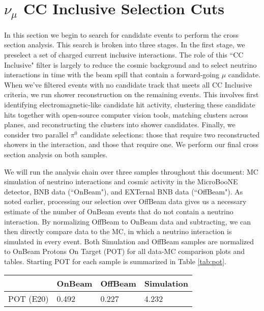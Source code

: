 \clearpage
\section{ $\nu_{\mu}$ CC Inclusive Selection Cuts }


\par In this section we begin to search for candidate events to perform the cross section analysis. This search is broken into three stages.  In the first stage, we preselect a set of charged current inclusive interactions. The role of this ``CC Inclusive" filter is largely to reduce the cosmic background and to select neutrino interactions in time with the beam spill that contain a forward-going $\mu$ candidate.  When we've filtered events with no candidate track that meets all CC Inclusive criteria, we run shower reconstruction on the remaining events.  This involves first identifying electromagnetic-like candidate hit activity, clustering these candidate hits together with open-source computer vision tools, matching clusters across planes, and reconstructing the clusters into shower candidates.  Finally, we consider two parallel $\pi^0$ candidate selections: those that require two reconstructed showers in the interaction, and those that require one.  We perform our final cross section analysis on both samples.
\par We will run the analysis chain over three samples throughout this document: MC simulation of neutrino interactions and cosmic activity in the MicroBooNE detector, BNB data (``OnBeam"), and EXTernal BNB data (``OffBeam").  As noted earlier, processing our selection over OffBeam data gives us a necessary estimate of the number of OnBeam events that do not contain a neutrino interaction.  By normalizing OffBeam to OnBeam data and subtracting, we can then directly compare data to the MC, in which a neutrino interaction is simulated in every event.  Both Simulation and OffBeam samples are normalized to OnBeam Protons On Target (POT) for all data-MC comparison plots and tables. Starting POT for each sample is summarized in Table \ref{tab:pot}.

\begin{table}[H] 
 \centering
 \begin{tabular}{| l | l | l | l |}
  \hline
   & OnBeam & OffBeam & Simulation \\ [0.1ex] \hline
POT (E20) & 0.492 & 0.227 & 4.232 \\ \hline
 \end{tabular}
\end{table}

